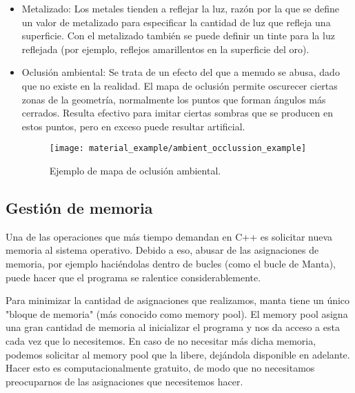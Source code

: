 \begin{itemize}
    \item Metalizado\cite{marmoset_basicpbr}: Los metales tienden a reflejar la luz, razón por la que se define un valor de metalizado para especificar la cantidad de luz que refleja una superficie. Con el metalizado también se puede definir un tinte para la luz reflejada (por ejemplo, reflejos amarillentos en la superficie del oro).
    \item Oclusión ambiental\cite{ambient_occlusion}: Se trata de un efecto del que a menudo se abusa, dado que no existe en la realidad. El mapa de oclusión permite oscurecer ciertas zonas de la geometría, normalmente los puntos que forman ángulos más cerrados. Resulta efectivo para imitar ciertas sombras que se producen en estos puntos, pero en exceso puede resultar artificial.
    \begin{figure}[H]
        \centering
        \texttt{[image: material\_example/ambient\_occlussion\_example]}
        \caption{Ejemplo de mapa de oclusión ambiental.}
        \label{fig:occlusion_ex}
    \end{figure}
\end{itemize}

\subsection{Gestión de memoria}
Una de las operaciones que más tiempo demandan en C++ es solicitar nueva memoria al sistema operativo. Debido a eso, abusar de las asignaciones de memoria, por ejemplo haciéndolas dentro de bucles (como el bucle de Manta), puede hacer que el programa se ralentice considerablemente.

Para minimizar la cantidad de asignaciones que realizamos, manta tiene un único "bloque de memoria" (más conocido como memory pool). El memory pool asigna una gran cantidad de memoria al inicializar el programa y nos da acceso a esta cada vez que lo necesitemos. En caso de no necesitar más dicha memoria, podemos solicitar al memory pool que la libere, dejándola disponible en adelante. Hacer esto es computacionalmente gratuito, de modo que no necesitamos preocuparnos de las asignaciones que necesitemos hacer.

